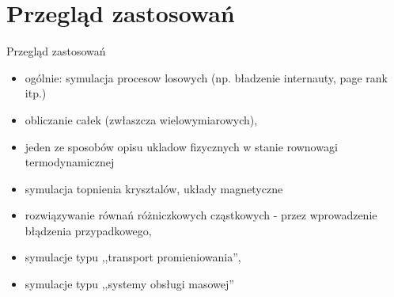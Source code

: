 \section{Przegląd zastosowań}
\begin{frame}{Przegląd zastosowań}
	\begin{itemize}
	\item ogólnie: symulacja procesow losowych (np. bładzenie internauty, page rank itp.)
		\item obliczanie całek (zwłaszcza wielowymiarowych),
		\item jeden ze sposobów opisu ukladow fizycznych w stanie rownowagi termodynamicznej
		\item symulacja topnienia krysztalów, układy magnetyczne
        \item rozwiązywanie równań różniczkowych cząstkowych - przez wprowadzenie błądzenia przypadkowego,
        \item symulacje typu ,,transport promieniowania'',
        \item symulacje typu ,,systemy obsługi masowej''
	\end{itemize}
\end{frame}